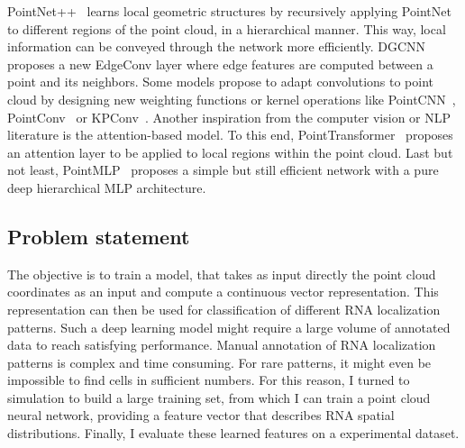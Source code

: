 PointNet++~\cite{Qi_2017} learns local geometric structures by recursively applying PointNet to different regions of the point cloud, in a hierarchical manner.
This way, local information can be conveyed through the network more efficiently.
DGCNN~\cite{Wang_2019} proposes a new EdgeConv layer where edge features are computed between a point and its neighbors.
Some models propose to adapt convolutions to point cloud by designing new weighting functions or kernel operations like PointCNN~\cite{Li_2018}, PointConv~\cite{Wu_2019_CVPR} or KPConv~\cite{Thomas_2019_ICCV}.
Another inspiration from the computer vision or NLP literature is the attention-based model.
To this end, PointTransformer~\cite{Zhao_2021_ICCV} proposes an attention layer to be applied to local regions within the point cloud.
Last but not least, PointMLP~\cite{ma2022rethinking} proposes a simple but still efficient network with a pure deep hierarchical MLP architecture.

\subsection{Problem statement}
\label{subsec:problem_statement}

The objective is to train a model, that takes as input directly the point cloud coordinates as an input and compute a continuous vector representation.%
This representation can then be used for classification of different \ac{RNA} localization patterns.
Such a deep learning model might require a large volume of annotated data to reach satisfying performance.
Manual annotation of \ac{RNA} localization patterns is complex and time consuming. For rare patterns, it might even be impossible to find cells in sufficient numbers. 
For this reason, I turned to simulation to build a large training set, from which I can train a point cloud neural network, providing a feature vector that describes \ac{RNA} spatial distributions.  
Finally, I evaluate these learned features on a experimental dataset.

